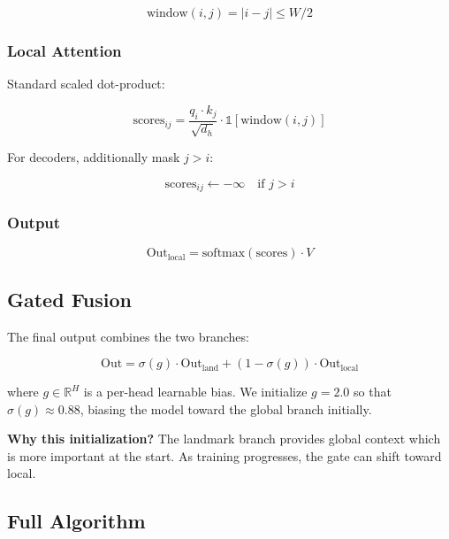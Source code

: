 \[
\text{window}(i, j) = |i - j| \leq W/2
\tag{4.12}
\]

\subsubsection{Local Attention}

Standard scaled dot-product:

\[
\text{scores}_{ij} = \frac{q_i \cdot k_j}{\sqrt{d_h}} \cdot \mathbb{1}[\text{window}(i,j)]
\tag{4.13}
\]

For decoders, additionally mask $j > i$:

\[
\text{scores}_{ij} \leftarrow -\infty \quad \text{if } j > i
\tag{4.14}
\]

\subsubsection{Output}

\[
\text{Out}_\text{local} = \text{softmax}(\text{scores}) \cdot V
\tag{4.15}
\]

\subsection{Gated Fusion}

The final output combines the two branches:

\[
\text{Out} = \sigma(g) \cdot \text{Out}_\text{land} + (1 - \sigma(g)) \cdot \text{Out}_\text{local}
\tag{4.16}
\]

where $g \in \mathbb{R}^H$ is a per-head learnable bias. We initialize 
$g = 2.0$ so that $\sigma(g) \approx 0.88$, biasing the model toward the 
global branch initially.

\textbf{Why this initialization?} The landmark branch provides global context 
which is more important at the start. As training progresses, the gate can 
shift toward local.

\subsection{Full Algorithm}

